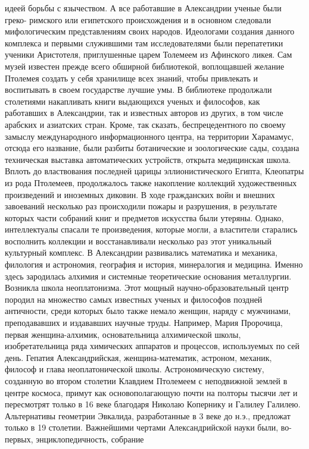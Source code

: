 идеей борьбы с язычеством. А все работавшие в Александрии ученые были греко-
римского или египетского происхождения и в основном следовали мифологическим
представлениям своих народов. Идеологами создания данного комплекса и первыми
служившими там исследователями были перепатетики ученики Аристотеля,
приглушенные царем Толемеем из Афинского ликея. Сам музей известен прежде всего
обширной библиотекой, воплощавшей желание Птолемея создать у себя хранилище всех
знаний, чтобы привлекать и воспитывать в своем государстве лучшие умы. В
библиотеке продолжали столетиями накапливать книги выдающихся ученых и
философов, как работавших в Александрии, так и известных авторов из других, в
том числе арабских и азиатских стран. Кроме, так сказать, беспрецедентного по
своему замыслу международного информационного центра, на территории Харамамус,
отсюда его название, были разбиты ботанические и зоологические сады, создана
техническая выставка автоматических устройств, открыта медицинская школа. Вплоть
до властвования последней царицы эллионистического Египта, Клеопатры из рода
Птолемеев, продолжалось также накопление коллекций художественных произведений и
иноземных диковин. В ходе гражданских войн и внешних завоеваний несколько раз
происходили пожары и разрушения, в результате которых части собраний книг и
предметов искусства были утеряны. Однако, интеллектуалы спасали те произведения,
которые могли, а властители старались восполнить коллекции и восстанавливали
несколько раз этот уникальный культурный комплекс. В Александрии развивались
математика и механика, филология и астрономия, география и история, минералогия
и медицина. Именно здесь зародилась алхимия и системные теоретические основания
металлургии. Возникла школа неоплатонизма. Этот мощный научно-образовательный
центр породил на множество самых известных ученых и философов поздней
античности, среди которых было также немало женщин, наряду с мужчинами,
преподававших и издававших научные труды. Например, Мария Пророчица, первая
женщина-алхимик, основательница алхимической школы, изобретательница ряда
химических аппаратов и процессов, используемых по сей день. Гепатия
Александрийская, женщина-математик, астроном, механик, философ и глава
неоплатонической школы. Астрономическую систему, созданную во втором столетии
Клавдием Птолемеем с неподвижной землей в центре космоса, примут как
основополагающую почти на полторы тысячи лет и пересмотрят только в 16 веке
благодаря Николаю Копернику и Галилеу Галилею. Альтернативы геометрии Эвкалида,
разработанные в 3 веке до н.э., предложат только в 19 столетии. Важнейшими
чертами Александрийской науки были, во-первых, энциклопедичность, собрание
